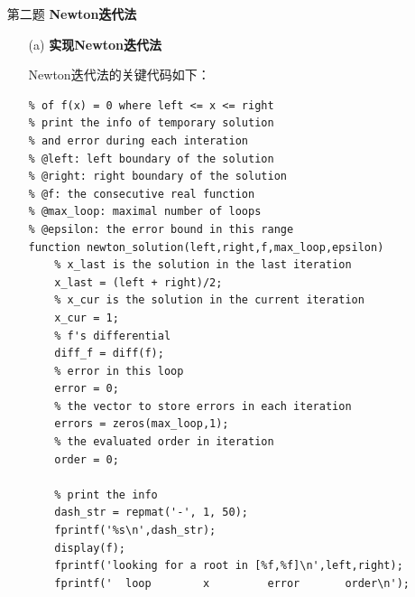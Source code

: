 \documentclass[12pt,a4paper,utf8]{ctexart}
\begin{document}
\begin{enumerate}
\item[第二题] \textbf{Newton迭代法}
    \begin{itemize}
    \item[(a)] \textbf{实现Newton迭代法}
    \par
    Newton迭代法的关键代码如下：
\begin{lstlisting}[frame=single]
% use Newton iteration to get the solution
% of f(x) = 0 where left <= x <= right
% print the info of temporary solution 
% and error during each interation
% @left: left boundary of the solution
% @right: right boundary of the solution
% @f: the consecutive real function
% @max_loop: maximal number of loops
% @epsilon: the error bound in this range
function newton_solution(left,right,f,max_loop,epsilon)
    % x_last is the solution in the last iteration
    x_last = (left + right)/2;
    % x_cur is the solution in the current iteration
    x_cur = 1;
    % f's differential
    diff_f = diff(f);
    % error in this loop
    error = 0;
    % the vector to store errors in each iteration
    errors = zeros(max_loop,1);
    % the evaluated order in iteration
    order = 0;
   
    % print the info
    dash_str = repmat('-', 1, 50);
    fprintf('%s\n',dash_str);
    display(f);
    fprintf('looking for a root in [%f,%f]\n',left,right);
    fprintf('  loop        x         error       order\n');
    

\end{lstlisting}
\end{itemize}
\end{enumerate}
\end{document}
